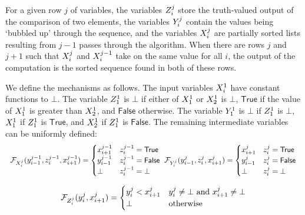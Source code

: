 \documentclass[twoside,11pt]{article}
\begin{document}
For a given row $j$ of variables, the variables $Z^j_i$ store the truth-valued output of the comparison of two elements, the variables $Y^j_i$ contain the values being `bubbled up' through the sequence, and the variables $X^j_i$ are partially sorted lists resulting from $j-1$ passes through the algorithm. When there are rows $j$ and $j+1$ such that $X^j_i$ and $X^{j-1}_i$ take on the same value for all $i$, the output of the computation is the sorted sequence found in both of these rows. 

We define the mechanisms as follows. The input variables $X_i^1$ have constant functions to $\bot$. The variable $Z_1^1$ is $\bot$ if either of $X^1_1$ or $X^1_2$ is $\bot$, $\mathsf{True}$ if the value of $X_1^1$ is greater than $X^1_2$, and $\mathsf{False}$ otherwise. The variable $Y_1^1$ is $\bot$ if $Z^1_1$ is $\bot$, $X^1_1$ if $Z_1^1$ is $\mathsf{True}$, and $X^1_2$ if $Z_1^1$ is $\mathsf{False}$. The remaining intermediate variables can be uniformly defined:
\[\begin{tabular}{c@{\hspace{0.5em}}c}
    $\mechanism{\onevar_i^j}(\onevall^{j-1}_{i-1}, \onevalll^{j-1}_i, \oneval^{j-1}_{i+1}) = \begin{cases}
     \oneval^{j-1}_{i+1} & \onevalll^{j-1}_i = \mathsf{True}\\
     \onevall^{j-1}_{i-1} & \onevalll^{j-1}_i = \mathsf{False}\\
     \bot & \onevalll^{j-1}_i = \bot\\
     \end{cases}$ & 
     $\mechanism{\onevarr_i^j}(\onevall^{j}_{i-1}, \onevalll^{j}_i, \oneval^{j}_{i+1}) = \begin{cases}
     \oneval^{j}_{i+1} & \onevalll^{j}_i = \mathsf{True}\\
     \onevall^{j}_{i-1} & \onevalll^{j}_i = \mathsf{False}\\
     \bot & \onevalll^{j}_i = \bot\\
     \end{cases} $\\
\end{tabular}\]

\[\mathcal{F}_{Z^j_i}(y^j_i, x^j_{i+1}) = \begin{cases} y^j_i < x^j_{i+1} & y^j_i  \not = \bot \text{ and } x^j_{i+1} \not = \bot \\
     \bot & \text{otherwise}
     \end{cases}\]
     
\end{document}
